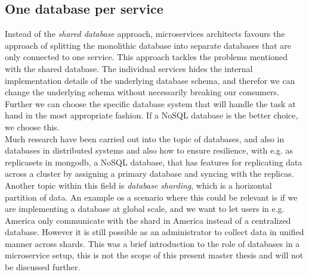 \subsection*{One database per service}
 Instead of the \textit{shared database} approach, microservices architects favours the approach of splitting the monolithic database into separate databases that are only connected to one service. This approach tackles the problems mentioned with the shared database. The individual services hides the internal implementation details of the underlying database schema, and therefor we can change the underlying schema without necessarily breaking our consumers. Further we can choose the specific database system that will handle the task at hand in the most appropriate fashion. If a NoSQL database is the better choice, we choose this.\\
 
 \noindent Much research have been carried out into the topic of databases, and also in databases in distributed systems and also how to ensure resilience, with e.g. as replicasets in mongodb, a NoSQL database, that has features for replicating data across a cluster by assigning a primary database and syncing with the replicas. Another topic within this field is \textit{database sharding}, which is a horizontal partition of data. An example os a scenario where this could be relevant is if we are implementing a database at global scale, and we want to let users in e.g. America only communicate with the shard in America instead of a centralized database. However it is still possible as an administrator to collect data in unified manner across shards. This was a brief introduction to the role of databases in a microservice setup, this is not the scope of this present master thesis and will not be discussed further.